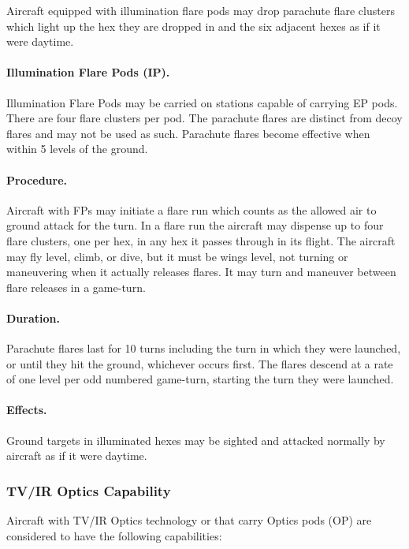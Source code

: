 Aircraft equipped with illumination flare pods may drop parachute flare clusters which light up the hex they are dropped in and the six adjacent hexes as if it were daytime.

\paragraph{Illumination Flare Pods (IP).} Illumination Flare Pods may be carried on stations capable of carrying EP pods. There are four flare clusters per pod. The parachute flares are distinct from decoy flares and may not be used as such. Parachute flares become effective when within 5 levels of the ground.

\paragraph{Procedure.} Aircraft with FPs may initiate a flare run which counts as the allowed air to ground attack for the turn. In a flare run the aircraft may dispense up to four flare clusters, one per hex, in any hex it passes through in its flight. The aircraft may fly level, climb, or dive, but it must be wings level, not turning or maneuvering when it actually releases flares. It may turn and maneuver between flare releases in a game-turn.

\paragraph{Duration.} Parachute flares last for 10 turns including the turn in which they were launched, or until they hit the ground, whichever occurs first. The flares descend at a rate of one level per odd numbered game-turn, starting the turn they were launched.

\paragraph{Effects.} Ground targets in illuminated hexes may be sighted and attacked normally by aircraft as if it were daytime.

\subsubsection{TV/IR Optics Capability}

Aircraft with TV/IR Optics technology or that carry Optics pods (OP) are considered to have the following capabilities:

